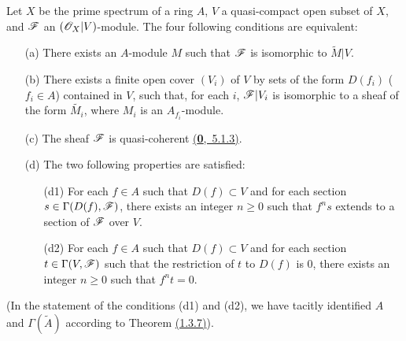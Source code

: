 \begin{thm}[1.4.1]
\label{thm-1.1.4.1}
Let $X$ be the prime spectrum of a ring $A$, $V$ a quasi-compact open subset of $X$, and
$\mathscr{F}$ an $(\mathscr{O}_X|V)$-module. The four following conditions are equivalent:
\begin{itemize}
  \item[{\rm(a)}] There exists an $A$-module $M$ such that $\mathscr{F}$ is isomorphic to
        $\widetilde{M}|V$.
  \item[{\rm(b)}] There exists a finite open cover $(V_i)$ of $V$ by sets of the form $D(f_i)$
        ($f_i\in A$) contained in $V$, such that, for each $i$, $\mathscr{F}|V_i$ is isomorphic to
        a sheaf of the form $\widetilde{M_i}$, where $M_i$ is an $A_{f_i}$-module.
  \item[{\rm(c)}] The sheaf $\mathscr{F}$ is quasi-coherent \hyperref[env-0.5.1.3]{(\textbf{0},~5.1.3)}.
  \item[{\rm(d)}] The two following properties are satisfied:
        \begin{itemize}
          \item[{\rm(d1)}] For each $f\in A$ such that $D(f)\subset V$ and for each section
                $s\in\Gamma(D(f),\mathscr{F})$, there exists an integer $n\geqslant 0$ such that
                $f^n s$ extends to a section of $\mathscr{F}$ over $V$.
          \item[{\rm(d2)}] For each $f\in A$ such that $D(f)\subset V$ and for each section
                $t\in\Gamma(V,\mathscr{F})$ such that the restriction of $t$ to $D(f)$ is $0$,
                there exists an integer $n\geqslant 0$ such that $f^n t=0$.
        \end{itemize}
\end{itemize}
\end{thm}
(In the statement of the conditions (d1) and (d2), we have tacitly identified $A$ and
$\Gamma(\widetilde{A})$ according to Theorem \hyperref[thm-1.1.3.7]{(1.3.7)}).

